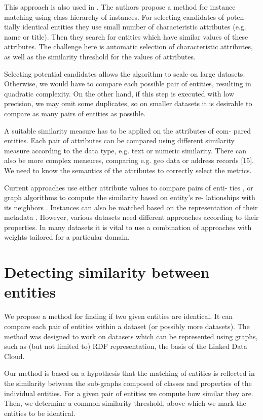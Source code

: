 \documentclass{llncs}
\begin{document}
This approach is also used in \cite{araujo2012serimi}. The authors propose a method for instance
matching using class hierarchy of instances. For selecting candidates of poten-
tially identical entities they use small number of characteristic attributes (e.g.
name or title). Then they search for entities which have similar values of these
attributes. The challenge here is automatic selection of characteristic attributes,
as well as the similarity threshold for the values of attributes.

Selecting potential candidates allows the algorithm to scale on large datasets.
Otherwise, we would have to compare each possible pair of entities, resulting
in quadratic complexity. On the other hand, if this step is executed with low
precision, we may omit some duplicates, so on smaller datasets it is desirable to
compare as many pairs of entities as possible.

A suitable similarity measure has to be applied on the attributes of com-
pared entities. Each pair of attributes can be compared using different similarity
measure according to the data type, e.g. text or numeric similarity. There can
also be more complex measures, comparing e.g. geo data or address records [15].
We need to know the semantics of the attributes to correctly select the metrics.

Current approaches use either attribute values to compare pairs of enti-
ties \cite{nikolov2012unsupervised}, or graph algorithms to compute the similarity based on entity's re-
lationships with its neighbors \cite{melnik2002similarity}. Instances can also be matched based on the
representation of their metadata \cite{shvaiko2005survey}. However, various datasets need different
approaches according to their properties. In many datasets it is vital to use a
combination of approaches with weights tailored for a particular domain.

\section{Detecting similarity between entities}

We propose a method for finding if two given entities are identical. It can compare
each pair of entities within a dataset (or possibly more datasets). The method
was designed to work on datasets which can be represented using graphs, such
as (but not limited to) RDF representation, the basis of the Linked Data Cloud.

Our method is based on a hypothesis that the matching of entities is reflected
in the similarity between the sub-graphs composed of classes and properties of
the individual entities. For a given pair of entities we compute how similar they
are. Then, we determine a common similarity threshold, above which we mark
the entities to be identical.
\end{document}
